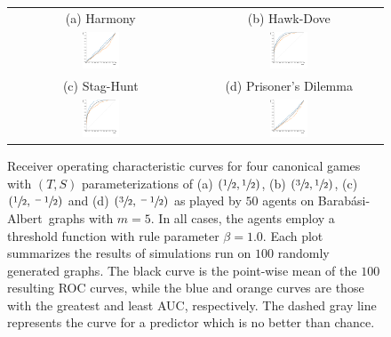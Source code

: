 \documentclass[letterpaper]{article}
\newcommand{\BA}{Barab\'{a}si-Albert~}
\newcommand{\BAbox}{\mbox{\BA}}
\begin{document}
\begin{figure}[!t]
    \begin{tabular}{cc}
        {\footnotesize (a) Harmony} & {\footnotesize (b) Hawk-Dove} \\
        \includegraphics[width=0.21\textwidth]{"ROC/h"} &
        \includegraphics[width=0.21\textwidth]{"ROC/hd"} \\
        {\footnotesize (c) Stag-Hunt} & {\footnotesize (d) Prisoner's Dilemma} \\
        \includegraphics[width=0.21\textwidth]{"ROC/sh"} &
        \includegraphics[width=0.21\textwidth]{"ROC/pd"}
    \end{tabular}
    \caption{\label{fig:rocs}
    Receiver operating characteristic curves for four canonical games with $(T,S)$ parameterizations of (a) $(\sfrac{1}{2},\sfrac{1}{2})$, (b) $(\sfrac{3}{2},\sfrac{1}{2})$, (c) $(\sfrac{1}{2},\sfrac{-1}{2})$ and (d) $(\sfrac{3}{2},\sfrac{-1}{2})$ as played by $50$ agents on \BAbox graphs with $m=5$. In all cases, the agents employ a threshold function with rule parameter $\beta=1.0$. Each plot summarizes the results of simulations run on $100$ randomly generated graphs. The black curve is the point-wise mean of the $100$ resulting ROC curves, while the blue and orange curves are those with the greatest and least AUC, respectively. The dashed gray line represents the curve for a predictor which is no better than chance.\\}
\end{figure}
\end{document}
